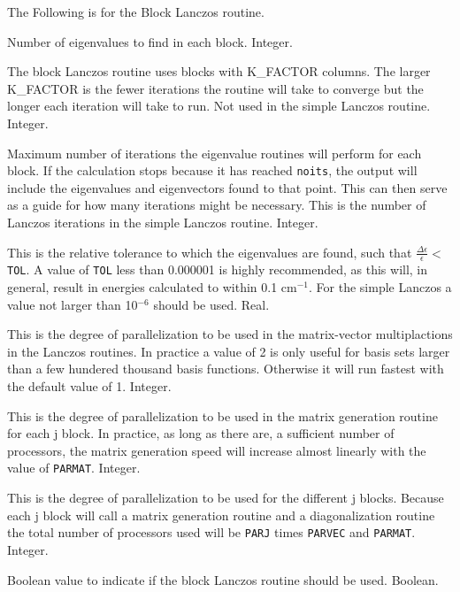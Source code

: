 \documentclass{article}
\newcommand{\wn}{cm$^{-1}$}
\begin{document}
\begin{description}
\item The Following is for the Block Lanczos routine.

\item[M] Number of eigenvalues to find in each block. Integer.

\item[K\_FACTOR] The block Lanczos routine uses blocks with 
  K\_FACTOR columns. The larger K\_FACTOR is the fewer iterations
  the routine will take to converge but the longer each iteration
  will take to run. Not used in the simple Lanczos routine. Integer.

\item[NOITS] Maximum number of iterations the eigenvalue routines
  will perform for each block. If the calculation stops because it has
  reached {\tt noits}, the output will include the eigenvalues and
  eigenvectors found to that point. This can then serve as a guide for
  how many iterations might be necessary. This is the number of Lanczos
  iterations in the simple Lanczos routine. Integer.

\item[TOL] This is the relative tolerance to which
  the eigenvalues are found, such that $\frac{\Delta \epsilon
    }{\epsilon } < ${\tt TOL}. A value of {\tt TOL} less than 0.000001 is highly
  recommended, as this will, in general, result in energies calculated
  to within 0.1 \wn . For the simple Lanczos a value not larger than 10$^{-6}$
  should be used. Real.
  
\item[PARVEC] This is the degree of parallelization to be used in
  the matrix-vector multiplactions in the Lanczos routines. In 
  practice a value of 2 is only useful for basis sets larger than
  a few hundered thousand basis functions. Otherwise it will run
  fastest with the default value of 1. Integer.

\item[PARMAT] This is the degree of parallelization to be used in
  the matrix generation routine for each j block. In practice, as long as there are,
  a sufficient number of processors, the matrix generation speed 
  will increase almost linearly with the value of {\tt PARMAT}. Integer.

\item[PARJ] This is the degree of parallelization to be used for
  the different j blocks.  Because each j block will call a matrix
  generation routine and a diagonalization routine the total number
  of processors used will be {\tt PARJ} times {\tt PARVEC} and {\tt PARMAT}. Integer.

\item[BLOCK\_LANCZOS] Boolean value to indicate if the block Lanczos
  routine should be used. Boolean.

\end{description}
\end{document}
